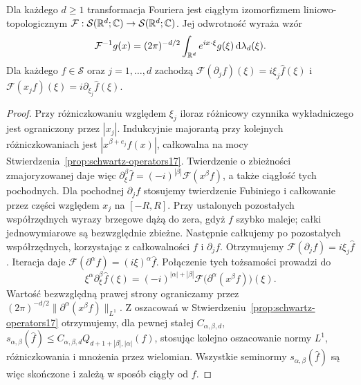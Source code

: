\begin{twierdzenie}
\label{thm:fourier-schwartz17}
Dla każdego $d\ge1$ transformacja Fouriera jest ciągłym
izomorfizmem liniowo-topologicznym
$\mathcal F:\mathcal S(\mathbb R^d;\mathbb C)\to\mathcal S(\mathbb R^d;\mathbb C)$.
Jej odwrotność wyraża wzór
\[
\mathcal F^{-1}g(x)=(2\pi)^{-d/2}
\int_{\mathbb R^d}e^{ix\cdot\xi}g(\xi)\,
\mathrm d\lambda_d(\xi).
\]
Dla każdego $f\in\mathcal S$ oraz $j=1,\dots,d$ zachodzą
$\mathcal F(\partial_jf)(\xi)=i\xi_j\widehat f(\xi)$
i $\mathcal F(x_jf)(\xi)=i\partial_{\xi_j}\widehat f(\xi)$.
\end{twierdzenie}
\begin{proof}
Przy różniczkowaniu względem $\xi_j$ iloraz różnicowy
czynnika wykładniczego jest ograniczony przez $|x_j|$.
Indukcyjnie majorantą przy kolejnych różniczkowaniach
jest $|x^{\beta+e_j}f(x)|$, całkowalna na mocy
Stwierdzenia~\ref{prop:schwartz-operators17}.
Twierdzenie o zbieżności zmajoryzowanej daje więc
$\partial_\xi^\beta\widehat f=(-i)^{|\beta|}
\mathcal F(x^\beta f)$, a także ciągłość tych pochodnych.
Dla pochodnej $\partial_j f$ stosujemy twierdzenie Fubiniego
i całkowanie przez części względem $x_j$ na $[-R,R]$.
Przy ustalonych pozostałych współrzędnych wyrazy brzegowe
dążą do zera, gdyż $f$ szybko maleje; całki jednowymiarowe
są bezwzględnie zbieżne. Następnie całkujemy po pozostałych
współrzędnych, korzystając z całkowalności $f$ i $\partial_j f$.
Otrzymujemy $\mathcal F(\partial_j f)=i\xi_j\widehat f$.
Iteracja daje $\mathcal F(\partial^\alpha f)=(i\xi)^\alpha\widehat f$.
Połączenie tych tożsamości prowadzi do
\[
\xi^\alpha\partial_\xi^\beta\widehat f(\xi)
=(-i)^{|\alpha|+|\beta|}
\mathcal F\bigl(\partial^\alpha(x^\beta f)\bigr)(\xi).
\]
Wartość bezwzględną prawej strony ograniczamy przez
$(2\pi)^{-d/2}\|\partial^\alpha(x^\beta f)\|_{L^1}$.
Z oszacowań w Stwierdzeniu~\ref{prop:schwartz-operators17}
otrzymujemy, dla pewnej stałej $C_{\alpha,\beta,d}$,
$s_{\alpha,\beta}(\widehat f)\le
C_{\alpha,\beta,d}Q_{d+1+|\beta|,|\alpha|}(f)$,
stosując kolejno oszacowanie normy $L^1$, różniczkowania
i mnożenia przez wielomian.
Wszystkie seminormy $s_{\alpha,\beta}(\widehat f)$ są więc
skończone i zależą w sposób ciągły od $f$.


\end{proof}
